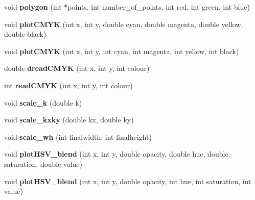 \begin{DoxyCompactItemize}
\item 
\hypertarget{classpngwriter_a898c2f5e179b79d343363dde36c6d78d}{}void {\bfseries polygon} (int $\ast$points, int number\+\_\+of\+\_\+points, int red, int green, int blue)\label{classpngwriter_a898c2f5e179b79d343363dde36c6d78d}

\item 
\hypertarget{classpngwriter_a7bdf8157705a13af0f98e0c44526e669}{}void {\bfseries plot\+C\+M\+Y\+K} (int x, int y, double cyan, double magenta, double yellow, double black)\label{classpngwriter_a7bdf8157705a13af0f98e0c44526e669}

\item 
\hypertarget{classpngwriter_a435c7c45d1c177071f114e44f41c5568}{}void {\bfseries plot\+C\+M\+Y\+K} (int x, int y, int cyan, int magenta, int yellow, int black)\label{classpngwriter_a435c7c45d1c177071f114e44f41c5568}

\item 
\hypertarget{classpngwriter_ad6588ba5d0824b7efb66ee2118565fa6}{}double {\bfseries dread\+C\+M\+Y\+K} (int x, int y, int colour)\label{classpngwriter_ad6588ba5d0824b7efb66ee2118565fa6}

\item 
\hypertarget{classpngwriter_acd9c7d85f82a637e7602071ea7ffc9b9}{}int {\bfseries read\+C\+M\+Y\+K} (int x, int y, int colour)\label{classpngwriter_acd9c7d85f82a637e7602071ea7ffc9b9}

\item 
\hypertarget{classpngwriter_a8f2359a0411884919385ac2e47a9a2c0}{}void {\bfseries scale\+\_\+k} (double k)\label{classpngwriter_a8f2359a0411884919385ac2e47a9a2c0}

\item 
\hypertarget{classpngwriter_abbca7d3d50e018aa6a372e6d8d2f7fb5}{}void {\bfseries scale\+\_\+kxky} (double kx, double ky)\label{classpngwriter_abbca7d3d50e018aa6a372e6d8d2f7fb5}

\item 
\hypertarget{classpngwriter_ab8fd9db3e917943551aff7ad4d5cb708}{}void {\bfseries scale\+\_\+wh} (int finalwidth, int finalheight)\label{classpngwriter_ab8fd9db3e917943551aff7ad4d5cb708}

\item 
\hypertarget{classpngwriter_a01997b314bd2c3753b65e2525178f337}{}void {\bfseries plot\+H\+S\+V\+\_\+blend} (int x, int y, double opacity, double hue, double saturation, double value)\label{classpngwriter_a01997b314bd2c3753b65e2525178f337}

\item 
\hypertarget{classpngwriter_aff4b80c52af26820c8e9a22b2e93a0e6}{}void {\bfseries plot\+H\+S\+V\+\_\+blend} (int x, int y, double opacity, int hue, int saturation, int value)\label{classpngwriter_aff4b80c52af26820c8e9a22b2e93a0e6}


\end{DoxyCompactItemize}
